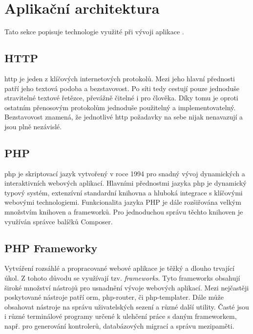\section{Aplikační architektura}
\label{sub:app-architecture}

Tato sekce popisuje technologie využité při vývoji aplikace \bso.

\subsection{HTTP}

\acrshort{http}\cite{http} je jeden z klíčových internetových protokolů. Mezi jeho hlavní přednosti patří jeho textová podoba a bezstavovost. Po síti tedy cestují pouze jednoduše stravitelné textové řetězce, převážně čitelné i pro člověka. Díky tomu je oproti ostatním přenosovým protokolům jednoduše použitelný a implementovatelný. Bezstavovost znamená, že jednotlivé \acrshort{http} požadavky na sebe nijak nenavazují a jsou plně nezávislé.

\subsection{PHP}
\label{sub:php}

\acrshort{php}\cite{php} je skriptovací jazyk vytvořený v roce 1994 pro snadný vývoj dynamických a interaktivních webových aplikací. Hlavními přednostmi jazyka \acrshort{php} je dynamický typový systém, extenzívní standardní knihovna a hluboká integrace s klíčovými webovými technologiemi. Funkcionalita jazyka PHP je dále rozšiřována velkým množstvím knihoven a frameworků. Pro jednoduchou správu těchto knihoven je využíván správce balíčků Composer\cite{composer}.

\subsection{PHP Frameworky}

Vytváření rozsáhlé a propracované webové aplikace je těžký a dlouho trvající úkol. Z tohoto důvodu se využívají tzv. \emph{\glspl{framework}}. Tyto \glspl{framework} obsahují široké množství nástrojů pro usnadnění vývoje webových aplikací. Mezi nejčastěji poskytované nástroje patří \Gls{orm}\cite{orm}, \gls{php-router}\cite{php-router}, či \gls{php-templater}\cite{php-templater}. Dále může obsahovat nástroje na správu uživatelských sezení a různé další utility. Časté jsou i různé terminálové programy určené k ulehčení práce s daným \gls{framework}em, např. pro generování kontrolerů, databázových migrací a správu mezipaměti.


